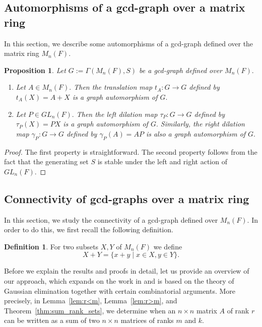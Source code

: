 \documentclass[12pt, a4paper]{amsart}
\newtheorem{prop}[thm]{Proposition}
\theoremstyle{definition}
\newtheorem{definition}[thm]{Definition}
\numberwithin{equation}{section}
\begin{document}
\subsection{Automorphisms of a gcd-graph over a matrix ring}
In this section, we describe some automorphisms of a gcd-graph defined over the matrix ring $M_n(F).$
\begin{prop} \label{prop:automorphism}
    Let $G:=\Gamma(M_n(F), S)$ be a gcd-graph defined over $M_n(F).$ 
    \begin{enumerate}
        \item Let $A \in M_n(F).$ Then the translation map $t_{A}: G \to G$ defined by $t_A(X)=A+X$ is a graph automorphism of $G.$
        \item Let $P \in GL_n(F).$ Then the left dilation map $\tau_{P}: G \to G$ defined by $\tau_P(X)=PX$ is a graph automorphism of $G.$ Similarly, the right dilation map $\gamma_P: G \to G$ defined by $\gamma_{P}(A)=AP$ is also a graph automorphism of $G.$
    \end{enumerate}
\end{prop}

\begin{proof}
    The first property is straightforward. The second property follows from the fact that the generating set $S$ is stable under the left and right action of $GL_n(F).$
\end{proof}

\subsection{Connectivity of gcd-graphs over a matrix ring} \label{subsec:connectivity}

In this section, we study the connectivity of a gcd-graph defined over $M_n(F).$ In order to do this, we first recall the following definition. 
\begin{definition} \label{def:set_addition}
    For two subsets $X, Y$ of $M_n(F)$ we define 
    \[ X+ Y = \{x+y \mid x \in X, y \in Y \}.\]
\end{definition}
Before we explain the results and proofs in detail, let us provide an overview of our approach, which expands on the work in \cite[Lemma 5.1]{guterman2021} and is based on the theory of Gaussian elimination together with certain combinatorial arguments. More precisely, in Lemma~\ref{lem:r<m}, Lemma~\ref{lem:r>m}, and Theorem~\ref{thm:sum_rank_sets}, we determine when an \(n \times n\) matrix \(A\) of rank \(r\) can be written as a sum of two \(n \times n\) matrices of ranks \(m\) and \(k\).
\end{document}
